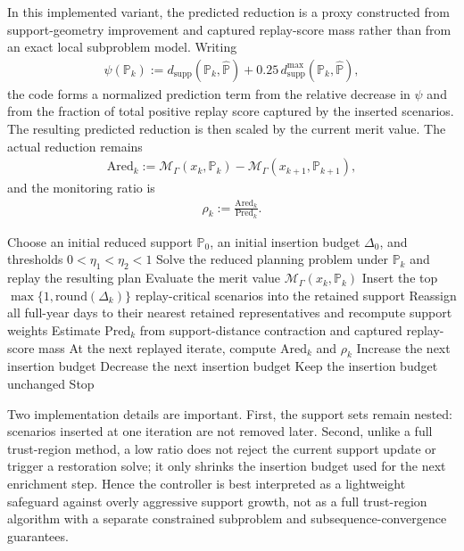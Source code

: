 In this implemented variant, the predicted reduction is a proxy constructed from support-geometry improvement and captured replay-score mass rather than from an exact local subproblem model. Writing
\begin{align}
\psi(\mathbb{P}_k) := d_{\mathrm{supp}}(\mathbb{P}_k,\widehat{\mathbb{P}}) + 0.25\, d^{\max}_{\mathrm{supp}}(\mathbb{P}_k,\widehat{\mathbb{P}}),
\end{align}
the code forms a normalized prediction term from the relative decrease in \(\psi\) and from the fraction of total positive replay score captured by the inserted scenarios. The resulting predicted reduction is then scaled by the current merit value. The actual reduction remains
\begin{align}
\mathrm{Ared}_k := \mathcal{M}_{\Gamma}(x_k,\mathbb{P}_k)-\mathcal{M}_{\Gamma}(x_{k+1},\mathbb{P}_{k+1}),
\label{eq:10a-actual-reduction}
\end{align}
and the monitoring ratio is
\begin{align}
\rho_k := \frac{\mathrm{Ared}_k}{\mathrm{Pred}_k}.
\label{eq:10a-trust-ratio}
\end{align}

\begin{algorithmic}[1]
\State Choose an initial reduced support \(\mathbb{P}_0\), an initial insertion budget \(\Delta_0\), and thresholds \(0<\eta_1<\eta_2<1\)
  \State Solve the reduced planning problem under \(\mathbb{P}_k\) and replay the resulting plan
  \State Evaluate the merit value \(\mathcal{M}_{\Gamma}(x_k,\mathbb{P}_k)\)
  \State Insert the top \(\max\{1,\mathrm{round}(\Delta_k)\}\) replay-critical scenarios into the retained support
  \State Reassign all full-year days to their nearest retained representatives and recompute support weights
  \State Estimate \(\mathrm{Pred}_k\) from support-distance contraction and captured replay-score mass
  \State At the next replayed iterate, compute \(\mathrm{Ared}_k\) and \(\rho_k\)
    \State Increase the next insertion budget
    \State Decrease the next insertion budget
  \Else
    \State Keep the insertion budget unchanged
  \EndIf
    \State Stop
  \EndIf
\EndFor
\end{algorithmic}

Two implementation details are important. First, the support sets remain nested: scenarios inserted at one iteration are not removed later. Second, unlike a full trust-region method, a low ratio does not reject the current support update or trigger a restoration solve; it only shrinks the insertion budget used for the next enrichment step. Hence the controller is best interpreted as a lightweight safeguard against overly aggressive support growth, not as a full trust-region algorithm with a separate constrained subproblem and subsequence-convergence guarantees.

